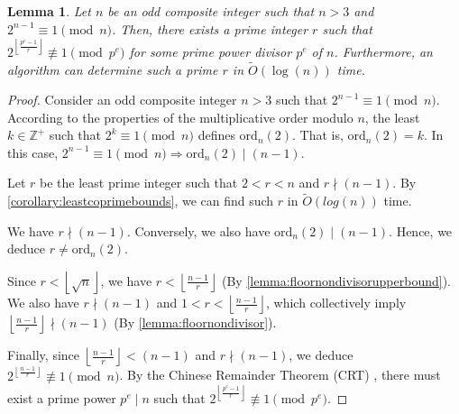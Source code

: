 \documentclass{article}
\theoremstyle{plain}
\theoremstyle{definition}
\newtheorem{lemma}{Lemma}
\newcommand{\floor}[1]{\left\lfloor #1 \right\rfloor}
\newcommand{\ord}{\text{ord}}
\newcommand{\D}{r}
\newcommand{\primep}{p}
\begin{document}
\begin{lemma} \label{lemma:dthpowerincongruencemodprimepower}
\textit{Let $n$ be an odd composite integer such that $n > 3$ and $2^{n-1} \equiv 1 \pmod{n}$. Then, there exists a prime integer $\D$ such that $2^{\floor{\frac{\primep^e-1}{\D}}} \not\equiv 1 \pmod{\primep^e}$ for some prime power divisor $\primep^e$ of $n$. Furthermore, an algorithm can determine such a prime $\D$ in $\tilde{O}(\log(n))$ time.}
\end{lemma}
\begin{proof}
Consider an odd composite integer $n > 3$ such that $2^{n-1} \equiv 1 \pmod{n}$. According to the properties of the multiplicative order modulo $n$, the least $k \in \mathbb{Z}^+$ such that $2^k \equiv 1 \pmod{n}$ defines $\ord_n(2)$. That is, $\ord_n(2) = k$. In this case, $2^{n-1} \equiv 1 \pmod{n} \Rightarrow \ord_n(2) \mid (n-1)$.

Let $\D$ be the least prime integer such that $2 < \D < n$ and $\D \nmid (n-1)$. By \cref{corollary:leastcoprimebounds}, we can find such $\D$ in $\tilde{O}(log(n))$ time.

We have $\D \nmid (n-1)$. Conversely, we also have $\ord_n(2) \mid (n-1)$. Hence, we deduce $\D \not= \ord_n(2)$. 

Since $\D < \left\lfloor\sqrt{n}\right\rfloor$, we have $\D < \left\lfloor \frac{n-1}{\D} \right\rfloor$ (By \cref{lemma:floornondivisorupperbound}). We also have $\D \nmid (n-1)$ and $1 < \D < \left\lfloor \frac{n-1}{\D} \right\rfloor$, which collectively imply $\left\lfloor \frac{n-1}{\D} \right\rfloor \nmid (n-1)$ (By \cref{lemma:floornondivisor}).

Finally, since $\left\lfloor\frac{n-1}{\D}\right\rfloor < (n-1)$ and $\D \nmid (n-1)$, we deduce $2^{\left\lfloor\frac{n-1}{\D}\right\rfloor} \not\equiv 1 \pmod{n}$. By the Chinese Remainder Theorem (CRT) \cite{cormen2009algorithms}, there must exist a prime power $\primep^e \mid n$ such that $2^{\left\lfloor\frac{\primep^e-1}{\D}\right\rfloor} \not\equiv 1 \pmod{\primep^e}$.
\end{proof}
\end{document}
